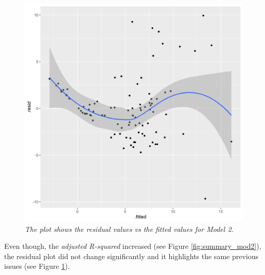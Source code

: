 \documentclass{article}
\begin{document}
	\begin{figure} 
		\centering
		\includegraphics[width=1\linewidth]{residuals_mod2.png}
		\caption{\textit{The plot shows the residual values vs the fitted values for Model 2.}}
		\label{fig:residuals_mod2}
	\end{figure}
	Even though, the \textit{adjusted R-squared} increased (see Figure \ref{fig:summary_mod2}), the residual plot did not change significantly and it highlights the same previous issues (see Figure \ref{fig:residuals_mod2}).
	
	\newpage

	
\end{document}
